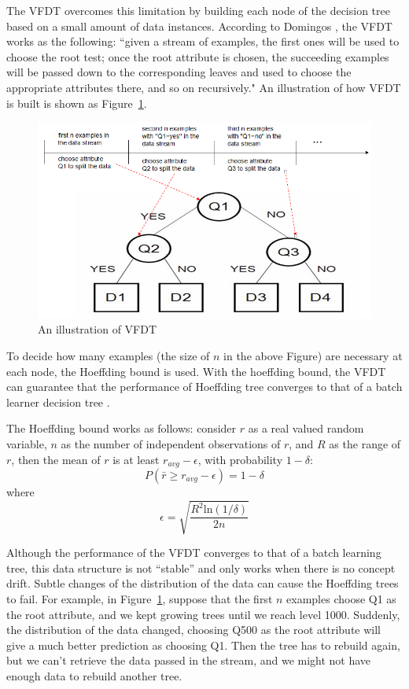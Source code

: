 \documentclass[conference]{IEEEtran}
\begin{document}
The VFDT overcomes this limitation by building each node of the decision tree based on a small amount of data instances. According to Domingos \cite{VFDT}, the VFDT works as the following: ``given a stream of examples, the first ones will be used to choose the root test; once the root attribute is chosen, the succeeding examples will be passed down to the corresponding leaves and used to choose the appropriate attributes there, and so on recursively." An illustration of how VFDT is built is shown as Figure~\ref{fig:VFDT}.

\begin{figure}[H]
	\centering
	\includegraphics[width=\linewidth]{figures/vfdt1} 
	\caption{An illustration of VFDT}
	\label{fig:VFDT}
\end{figure}
To decide how many examples (the size of $n$ in the above Figure) are necessary at each node, the Hoeffding bound is used. With the hoeffding bound, the VFDT can guarantee that the performance of Hoeffding tree converges to that of a batch learner decision tree \cite{VFDT}.

The Hoeffding bound works as follows: consider $r$ as a real valued random variable, $n$ as the number of independent observations of $r$, and $R$ as the range of $r$, then the mean of $r$ is at least $r_{avg}-\epsilon$, with probability $1-\delta$: 
$$P(\bar{r} \geq r_{avg}-\epsilon) = 1-\delta$$ where $$ \epsilon=\sqrt{\frac{R^2 \text{ln}(1/\delta)}{2n}}$$

Although the performance of the VFDT converges to that of a batch learning tree, this data structure is not ``stable'' and only works when there is no concept drift. Subtle changes of the distribution of the data can cause the Hoeffding trees to fail. For example, in Figure~\ref{fig:VFDT}, suppose that the first $n$ examples choose Q1 as the root attribute, and we kept growing trees until we reach level 1000. Suddenly, the distribution of the data changed, choosing Q500 as the root attribute will give a much better prediction as choosing Q1. Then the tree has to rebuild again, but we can't retrieve the data passed in the stream, and we might not have enough data to rebuild another tree.
\end{document}
